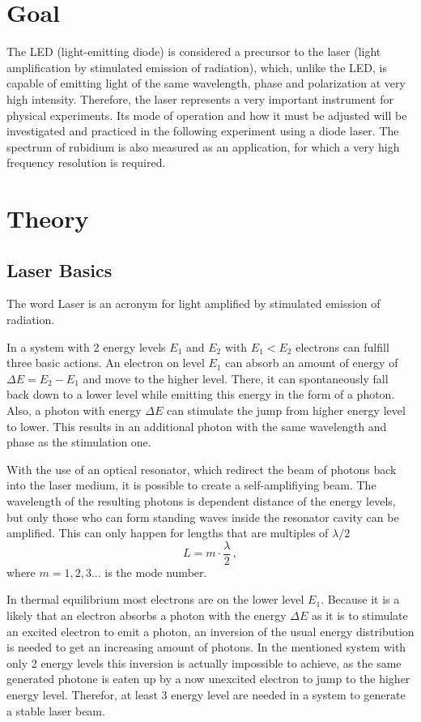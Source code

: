 \section{Goal}
The LED (light-emitting diode) is considered a precursor to the laser (light amplification by stimulated emission of radiation), which, unlike the LED, is capable of emitting light of the same wavelength, phase and polarization at very high intensity. Therefore, the laser represents a very important instrument for physical experiments. Its mode of operation and how it must be adjusted will be investigated and practiced in the following experiment using a diode laser. The spectrum of rubidium is also measured as an application, for which a very high frequency resolution is required.
\section{Theory}
\label{sec:Theorie}

\subsection{Laser Basics}

The word Laser is an acronym for light amplified by stimulated emission of radiation. 

In a system with 2 energy levels $E_1$ and $E_2$ with $E_1 < E_2$ electrons can fulfill three basic actions.
An electron on level $E_1$ can absorb an amount of energy of $\Delta E = E_2 - E_1$ and move to the higher level.
There, it can spontaneously fall back down to a lower level while emitting this energy in the form of a photon.
Also, a photon with energy $\Delta E$ can stimulate the jump from higher energy level to lower. 
This results in an additional photon with the same wavelength and phase as the stimulation one.

With the use of an optical resonator, which redirect the beam of photons back into the laser medium, it is possible to create a self-amplifiying beam.
The wavelength of the resulting photons is dependent distance of the energy levels, but only those who can form standing waves inside the resonator cavity can be amplified.
This can only happen for lengths that are multiples of $\lambda/2$
\begin{equation}
    L = m \cdot \frac{\lambda}{2} \, ,
\end{equation}
where $m = 1, 2, 3 ...$ is the mode number.

In thermal equilibrium most electrons are on the lower level $E_1$. Because it is a likely that an electron absorbs a photon with the energy $\Delta E$
as it is to stimulate an excited electron to emit a photon, an inversion of the usual energy distribution is needed to get an increasing amount of photons.
In the mentioned system with only 2 energy levels this inversion is actually impossible to achieve, as the same generated photone is eaten up by a now unexcited electron to jump to the higher energy level.
Therefor, at least 3 energy level are needed in a system to generate a stable laser beam.


